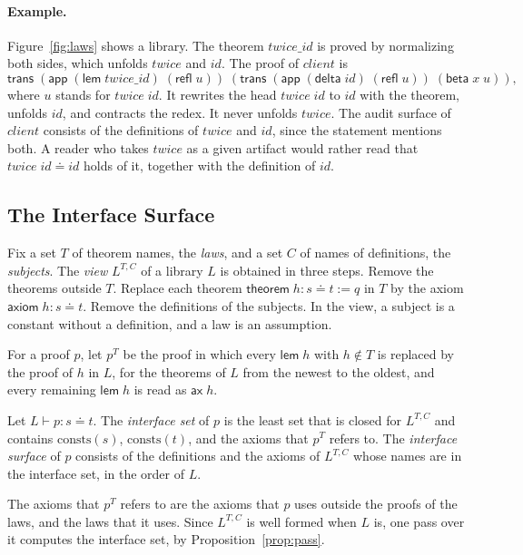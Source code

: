 \documentclass[acmsmall,nonacm,screen]{acmart}
\newcommand{\eqd}{\doteq}
\newcommand{\kw}[1]{\mathsf{#1}}
\newcommand{\nm}[1]{\mathit{#1}}
\newcommand{\chk}[4]{#1 \vdash #2 : #3 \eqd #4}
\newcommand{\consts}{\mathrm{consts}}
\newcommand{\view}[1]{#1^{T,C}}
\begin{document}
\paragraph{Example.}
Figure~\ref{fig:laws} shows a library. The theorem $\nm{twice\_id}$ is proved by normalizing both
sides, which unfolds $\nm{twice}$ and $\nm{id}$. The proof of $\nm{client}$ is
\[
\kw{trans}\;(\kw{app}\;(\kw{lem}\;\nm{twice\_id})\;(\kw{refl}\;u))\;
  (\kw{trans}\;(\kw{app}\;(\kw{delta}\;\nm{id})\;(\kw{refl}\;u))\;(\kw{beta}\;x\;u)),
\]
where $u$ stands for $\nm{twice}\;\nm{id}$.
It rewrites the head $\nm{twice}\;\nm{id}$ to $\nm{id}$ with the theorem, unfolds $\nm{id}$, and
contracts the redex. It never unfolds $\nm{twice}$. The audit surface of $\nm{client}$ consists
of the definitions of $\nm{twice}$ and $\nm{id}$, since the statement mentions both. A reader who
takes $\nm{twice}$ as a given artifact would rather read that $\nm{twice}\;\nm{id} \eqd \nm{id}$
holds of it, together with the definition of $\nm{id}$.

\subsection{The Interface Surface}

Fix a set $T$ of theorem names, the \emph{laws}, and a set $C$ of names of definitions, the
\emph{subjects}. The \emph{view} $\view{L}$ of a library $L$ is obtained in three steps. Remove
the theorems outside $T$. Replace each theorem $\kw{theorem}\;h : s \eqd t := q$ in $T$ by the
axiom $\kw{axiom}\;h : s \eqd t$. Remove the definitions of the subjects. In the view, a subject
is a constant without a definition, and a law is an assumption.

For a proof $p$, let $p^T$ be the proof in which every $\kw{lem}\;h$ with $h \notin T$ is
replaced by the proof of $h$ in $L$, for the theorems of $L$ from the newest to the oldest, and
every remaining $\kw{lem}\;h$ is read as $\kw{ax}\;h$.

\begin{definition}
\label{def:iface}
Let $\chk{L}{p}{s}{t}$. The \emph{interface set} of $p$ is the least set that is closed for
$\view{L}$ and contains $\consts(s)$, $\consts(t)$, and the axioms that $p^T$ refers to. The
\emph{interface surface} of $p$ consists of the definitions and the axioms of $\view{L}$ whose
names are in the interface set, in the order of $L$.
\end{definition}

The axioms that $p^T$ refers to are the axioms that $p$ uses outside the proofs of the laws,
and the laws that it uses. Since $\view{L}$ is well formed when $L$ is, one pass over it computes
the interface set, by Proposition~\ref{prop:pass}.
\end{document}
